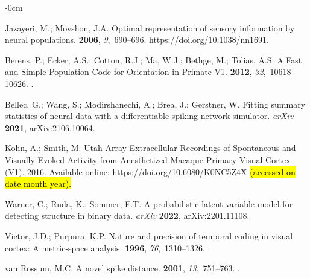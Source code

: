 \documentclass[brainsci, %
               review,accept,pdftex,moreauthors
               ]{Definitions/mdpi}
\begin{document}
\begin{adjustwidth}{-\extralength}{0cm}
\begin{thebibliography}{999}
Jazayeri, M.; Movshon, J.A.
\newblock Optimal representation of sensory information by neural populations.
 {\bf 2006}, {\em 9},~690--696.
  {{https://doi.org/10.1038/nn1691}}.

Berens, P.; Ecker, A.S.; Cotton, R.J.; Ma, W.J.; Bethge, M.; Tolias, A.S.
\newblock A {Fast} and {Simple} {Population} {Code} for {Orientation} in
  {Primate} {V1}.
 {\bf 2012}, {\em 32},~10618--10626.
.

Bellec, G.; Wang, S.; Modirshanechi, A.; Brea, J.; Gerstner, W.
\newblock Fitting summary statistics of neural data with a differentiable
  spiking network simulator. \emph{arXiv} \textbf{2021},  	arXiv:2106.10064.

Kohn, A.; Smith, M.
\newblock Utah Array Extracellular Recordings of Spontaneous and Visually
  Evoked Activity from Anesthetized Macaque Primary Visual Cortex ({V1}). 
  2016.   
Available online: {\url{https://doi.org/10.6080/K0NC5Z4X}}  \hl{(accessed on date month year).} %


Warner, C.; Ruda, K.; Sommer, F.T.
\newblock A probabilistic latent variable model for detecting structure in
  binary data. \emph{arXiv} \textbf{2022}, arXiv:2201.11108.

Victor, J.D.; Purpura, K.P.
\newblock Nature and precision of temporal coding in visual cortex: A
  metric-space analysis.
 {\bf 1996}, {\em 76},~1310--1326.
.

van Rossum, M.C.
\newblock A novel spike distance.
 {\bf 2001}, {\em 13},~751--763.
.


\end{thebibliography}
\end{adjustwidth}
\end{document}
